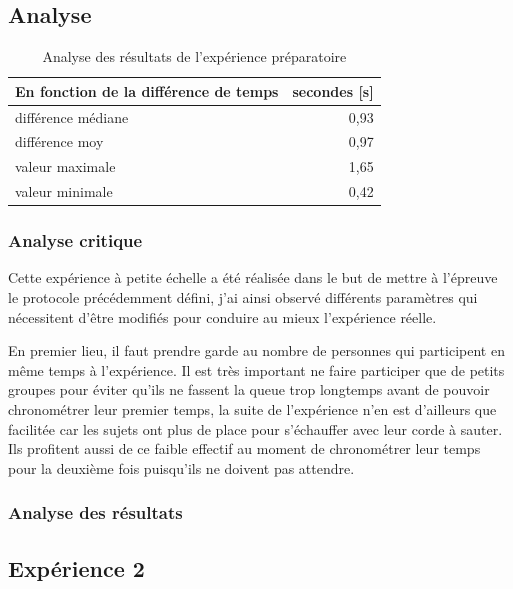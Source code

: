 \documentclass[12pt,fleqn,oneside,openany]{book} %
\begin{document}
\subsection{Analyse} \label{ssec:analyse2.1}

\begin{table}[h]
	\centering
	\caption{Analyse des résultats de l'expérience préparatoire} \label{tbl:analyse2.1}
	\begin{tabular}{lr}
		\toprule 
		\textbf{En fonction de la différence de temps} & \textbf{secondes [s]} \\ \midrule
		différence médiane & 0,93 \\
		différence moy & 0,97 \\
		valeur maximale & 1,65 \\
		valeur minimale & 0,42 \\ \bottomrule
	\end{tabular}
\end{table}

\subsubsection{Analyse critique} \label{sssec:analyseCrit2.1}
Cette expérience à petite échelle a été réalisée dans le but de mettre à l'épreuve le protocole précédemment défini, j'ai ainsi observé différents paramètres qui nécessitent d'être modifiés pour conduire au mieux l'expérience réelle. 

En premier lieu, il faut prendre garde au nombre de personnes qui participent en même temps à l'expérience. Il est très important ne faire participer que de petits groupes pour éviter qu'ils ne fassent la queue trop longtemps avant de pouvoir chronométrer leur premier temps, la suite de l'expérience n'en est d'ailleurs que facilitée car les sujets ont plus de place pour s'échauffer avec leur corde à sauter. Ils profitent aussi de ce faible effectif au moment de chronométrer leur temps pour la deuxième fois puisqu'ils ne doivent pas attendre.

\subsubsection{Analyse des résultats} \label{sssec:analyseResult2.1}

\subsection{Expérience 2} \label{ssec:but2.2}
\end{document}
